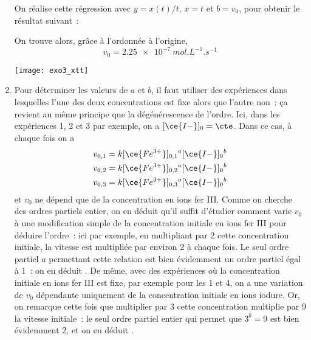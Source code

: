 \documentclass[a4paper, 12pt, final, garamond]{book}
\begin{document}
\begin{enumerate}
        On réalise cette régression avec $y = x(t)/t$, $x = t$ et $b = v_0$,
        pour obtenir le résultat suivant~:
        \begin{minipage}{0.45\linewidth}
            On trouve alors, grâce à l'ordonnée à l'origine,
            \[\boxed{v_0 = \SI{2.25e-7}{mol.L^{-1}.s^{-1}}}\]
        \end{minipage}
        \begin{minipage}{0.55\linewidth}
            \begin{center}
                \texttt{[image: exo3\_xtt]}
            \end{center}
        \end{minipage}
    \item Pour déterminer les valeurs de $a$ et $b$, il faut utiliser des
        expériences dans lesquelles l'une des deux concentrations est fixe alors
        que l'autre non~: ça revient au même principe que la dégénérescence de
        l'ordre.\bigbreak
        Ici, dans les expériences 1, 2 et 3 par exemple, on a $[\ce{I-}]_0 =
        \cte$. Dans ce cas, à chaque fois on a
        \begin{gather*}
            v_{0,1} = k[\ce{Fe^{3+}}]_{0,1}{}^a [\ce{I-}]_0{}^b\\
            v_{0,2} = k[\ce{Fe^{3+}}]_{0,2}{}^a [\ce{I-}]_0{}^b\\
            v_{0,3} = k[\ce{Fe^{3+}}]_{0,3}{}^a [\ce{I-}]_0{}^b
        \end{gather*}
        et $v_0$ ne dépend que de la concentration en ions fer III. Comme on
        cherche des ordres partiels entier, on en déduit qu'il suffit d'étudier
        comment varie $v_0$ à une modification simple de la concentration
        initiale en ions fer III pour déduire l'ordre~: ici par exemple, en
        multipliant par $2$ cette concentration initiale, la vitesse est
        multipliée par environ 2 à chaque fois. Le seul ordre partiel $a$
        permettant cette relation est bien évidemment un ordre partiel égal à
        1~: on en déduit . \bigbreak
        De même, avec des expériences où la concentration initiale en ions fer
        III est fixe, par exemple pour les 1 et 4, on a une variation de $v_0$
        dépendante uniquement de la concentration initiale en ions iodure. Or,
        on remarque cette fois que multiplier par 3 cette concentration multiplie
        par 9 la vitesse initiale~: le seul ordre partiel entier qui permet que
        $3^b = 9$ est bien évidemment 2, et on en déduit .

\end{enumerate}
\end{document}
